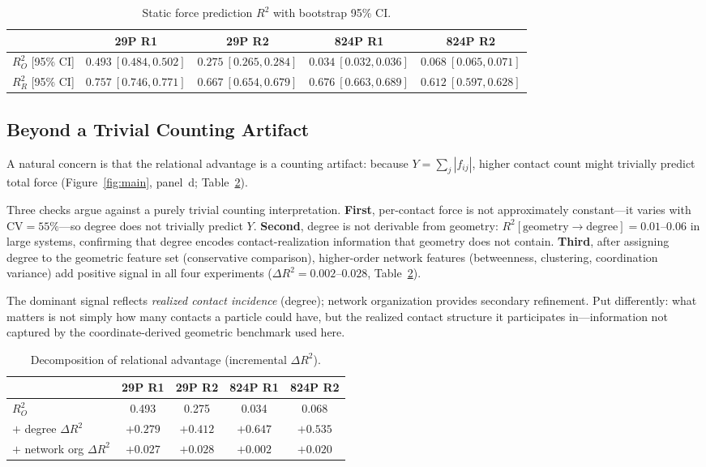 \documentclass[11pt,a4paper]{article}
\begin{document}
\begin{table}[h]
\centering
\caption{Static force prediction $R^2$ with bootstrap 95\% CI.}
\label{tab:static}
\begin{tabular}{lcccc}
\toprule
 & 29P R1 & 29P R2 & 824P R1 & 824P R2 \\
\midrule
$R^2_O$ [95\% CI] & $0.493\ [0.484, 0.502]$ & $0.275\ [0.265, 0.284]$ & $0.034\ [0.032, 0.036]$ & $0.068\ [0.065, 0.071]$ \\
$R^2_R$ [95\% CI] & $0.757\ [0.746, 0.771]$ & $0.667\ [0.654, 0.679]$ & $0.676\ [0.663, 0.689]$ & $0.612\ [0.597, 0.628]$ \\
\bottomrule
\end{tabular}
\end{table}

\subsection{Beyond a Trivial Counting Artifact}\label{sec:counting}

A natural concern is that the relational advantage is a counting artifact: because $Y = \sum_j|f_{ij}|$, higher contact count might trivially predict total force (Figure~\ref{fig:main}, panel~d; Table~\ref{tab:decomp}).

Three checks argue against a purely trivial counting interpretation.
\textbf{First}, per-contact force is not approximately constant---it varies with $\mathrm{CV} = 55\%$---so degree does not trivially predict $Y$.
\textbf{Second}, degree is not derivable from geometry: $R^2[\text{geometry}\!\rightarrow\!\text{degree}] = 0.01$--$0.06$ in large systems, confirming that degree encodes contact-realization information that geometry does not contain.
\textbf{Third}, after assigning degree to the geometric feature set (conservative comparison), higher-order network features (betweenness, clustering, coordination variance) add positive signal in all four experiments ($\Delta R^2 = 0.002$--$0.028$, Table~\ref{tab:decomp}).

The dominant signal reflects \textit{realized contact incidence} (degree); network organization provides secondary refinement. Put differently: what matters is not simply how many contacts a particle could have, but the realized contact structure it participates in---information not captured by the coordinate-derived geometric benchmark used here.

\begin{table}[h]
\centering
\caption{Decomposition of relational advantage (incremental $\Delta R^2$).}
\label{tab:decomp}
\begin{tabular}{lcccc}
\toprule
 & 29P R1 & 29P R2 & 824P R1 & 824P R2 \\
\midrule
$R^2_O$ & 0.493 & 0.275 & 0.034 & 0.068 \\
$+$ degree $\Delta R^2$ & $+0.279$ & $+0.412$ & $+0.647$ & $+0.535$ \\
$+$ network org $\Delta R^2$ & $+0.027$ & $+0.028$ & $+0.002$ & $+0.020$ \\
\bottomrule
\end{tabular}
\end{table}
\end{document}
